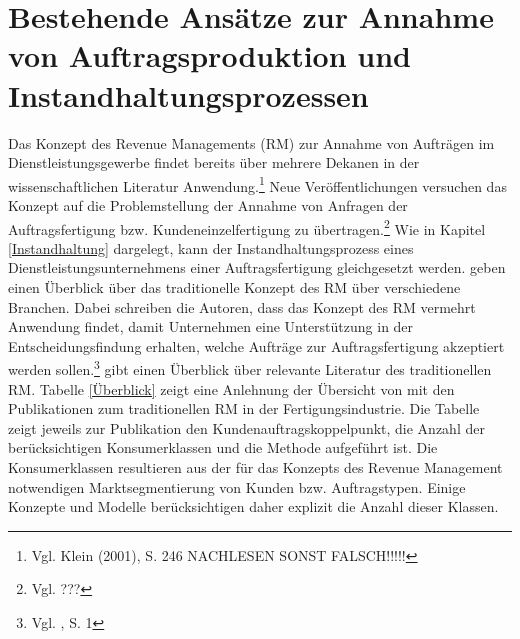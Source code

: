 \chapter{Bestehende Ansätze zur Annahme von Auftragsproduktion und Instandhaltungsprozessen}
\setcounter{footnote}{4}  %

Das Konzept des Revenue Managements (RM) zur Annahme von Aufträgen im Dienstleistungsgewerbe findet bereits über mehrere Dekanen in der wissenschaftlichen Literatur Anwendung.\footnote{Vgl. Klein (2001), S. 246 NACHLESEN SONST FALSCH!!!!!} Neue Veröffentlichungen versuchen das Konzept auf die Problemstellung der Annahme von Anfragen der Auftragsfertigung bzw. Kundeneinzelfertigung zu übertragen.\footnote{Vgl. ???} Wie in Kapitel \ref{Instandhaltung} dargelegt, kann der Instandhaltungsprozess eines Dienstleistungsunternehmens einer Auftragsfertigung gleichgesetzt werden. \cite{kimms2005revenue} geben einen Überblick über das traditionelle Konzept des RM über verschiedene Branchen. Dabei schreiben die Autoren, dass das Konzept des RM vermehrt Anwendung findet, damit Unternehmen eine Unterstützung in der Entscheidungsfindung erhalten, welche Aufträge zur Auftragsfertigung akzeptiert werden sollen.\footnote{Vgl. \cite{kimms2005revenue}, S. 1} \cite{quante2009management} gibt einen Überblick über relevante Literatur des traditionellen RM. Tabelle \ref{Überblick} zeigt eine Anlehnung der Übersicht von \cite{quante2009management} mit den Publikationen zum traditionellen RM in der Fertigungsindustrie. Die Tabelle zeigt jeweils zur Publikation den Kundenauftragskoppelpunkt, die Anzahl der berücksichtigen Konsumerklassen und die Methode aufgeführt ist. Die Konsumerklassen resultieren aus der für das Konzepts des Revenue Management notwendigen Marktsegmentierung von Kunden bzw. Auftragstypen. Einige Konzepte und Modelle berücksichtigen daher explizit die Anzahl dieser Klassen.


